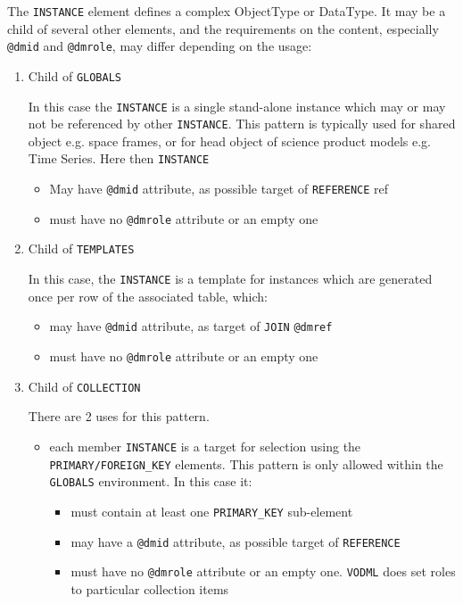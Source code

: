 The \texttt{INSTANCE} element defines a complex ObjectType or DataType.
It may be a child of several other elements, and the requirements on
the content, especially  \texttt{@dmid} and  \texttt{@dmrole}, may differ depending on
the usage:


\begin{enumerate}
\item Child of \texttt{GLOBALS}

   In this case the \texttt{INSTANCE} is a single stand-alone instance which
   may or may not be referenced by other \texttt{INSTANCE}. This pattern is typically used for 
   shared object e.g. space frames, or for head object of science product models e.g. Time Series.
   Here then \texttt{INSTANCE}
  \begin{itemize}
     \item May have  \texttt{@dmid} attribute, as possible target of \texttt{REFERENCE} ref
     \item must have no  \texttt{@dmrole} attribute or an empty one
  \end{itemize}  
     
\item Child of \texttt{TEMPLATES}

  In this case, the \texttt{INSTANCE} is a template for instances which
  are generated once per row of the associated table, which:
  \begin{itemize}
     \item may have  \texttt{@dmid} attribute, as target of \texttt{JOIN} \texttt{@dmref}
     \item must have no  \texttt{@dmrole} attribute or an empty one
  \end{itemize}  

\item Child of \texttt{COLLECTION}

  There are 2 uses for this pattern.  
  \begin{itemize}
     \item each member \texttt{INSTANCE} is a target for selection using
           the \texttt{PRIMARY/FOREIGN\_KEY} elements. This pattern is only 
           allowed within the \texttt{GLOBALS} environment. In this case it:             
           \begin{itemize}
             \item must contain at least one \texttt{PRIMARY\_KEY} sub-element
             \item may have a  \texttt{@dmid} attribute, as possible target of \texttt{REFERENCE}              
             \item must have no  \texttt{@dmrole} attribute or an empty one. \texttt{VODML} does set roles to particular collection items
           \end{itemize}


\end{itemize}
\end{enumerate}
